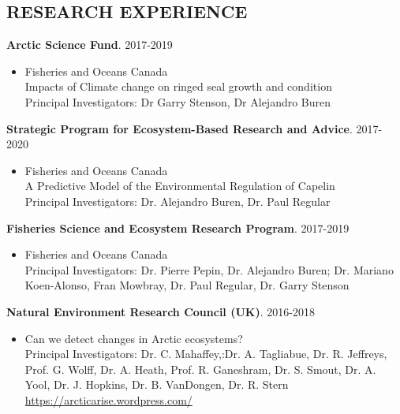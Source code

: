 \documentclass{res}
\begin{document}
\begin{resume}
\section{RESEARCH EXPERIENCE}
\vspace{0.1in}
{\bf Arctic Science Fund}. 2017-2019
\begin{itemize} %
	\item[] Fisheries and Oceans Canada\\
	Impacts of Climate change on ringed seal growth and condition\\
	Principal Investigators: Dr Garry Stenson, Dr Alejandro Buren
\end{itemize}
{\bf Strategic Program for Ecosystem-Based Research and Advice}. 2017-2020
\begin{itemize} %
	\item[] Fisheries and Oceans Canada\\
	A Predictive Model of the Environmental Regulation of Capelin\\
	Principal Investigators: Dr. Alejandro Buren, Dr. Paul Regular
\end{itemize}

\textbf{Fisheries Science and Ecosystem Research Program}. 2017-2019
\begin{itemize} %
	\item[] Fisheries and Oceans Canada\\
Principal Investigators: Dr. Pierre Pepin, Dr. Alejandro Buren; Dr. Mariano Koen-Alonso, Fran Mowbray, Dr. Paul Regular, Dr. Garry Stenson
\end{itemize}

\textbf{Natural Environment Research Council (UK)}. 2016-2018
\begin{itemize} %
	\item[] Can we detect changes in Arctic ecosystems?\\
Principal Investigators: Dr. C. Mahaffey,:Dr. A. Tagliabue, Dr. R. Jeffreys, Prof. G. Wolff, Dr. A. Heath, Prof. R. Ganeshram, Dr. S. Smout, Dr. A. Yool, Dr. J. Hopkins, Dr. B. VanDongen, Dr. R. Stern \\
\url{https://arcticarise.wordpress.com/}
\end{itemize}


\end{resume}
\end{document}
